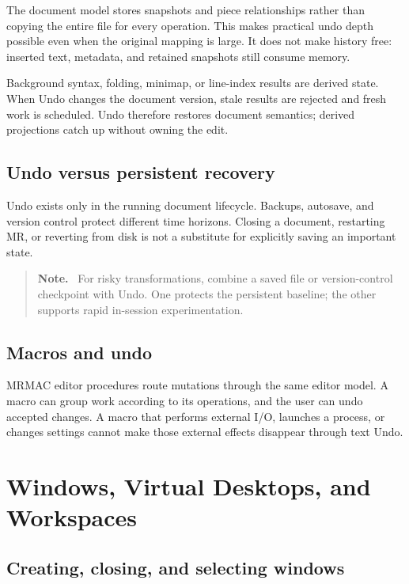 \documentclass[a4paper,10pt,twoside,openany]{book}
\newcommand{\mr}{\textsc{MR}}
\newenvironment{usernote}{\begin{quote}\small\textbf{Note.}\ }{\end{quote}}
\begin{document}
The document model stores snapshots and piece relationships rather than
copying the entire file for every operation. This makes practical undo depth
possible even when the original mapping is large. It does not make history
free: inserted text, metadata, and retained snapshots still consume memory.

Background syntax, folding, minimap, or line-index results are derived state.
When Undo changes the document version, stale results are rejected and fresh
work is scheduled. Undo therefore restores document semantics; derived
projections catch up without owning the edit.

\section{Undo versus persistent recovery}

Undo exists only in the running document lifecycle. Backups, autosave, and
version control protect different time horizons. Closing a document,
restarting \mr{}, or reverting from disk is not a substitute for explicitly
saving an important state.

\begin{usernote}
For risky transformations, combine a saved file or version-control checkpoint
with Undo. One protects the persistent baseline; the other supports rapid
in-session experimentation.
\end{usernote}

\section{Macros and undo}

MRMAC editor procedures route mutations through the same editor model.
A macro can group work according to its operations, and the user can undo
accepted changes. A macro that performs external I/O, launches a process, or
changes settings cannot make those external effects disappear through text
Undo.

\chapter{Windows, Virtual Desktops, and Workspaces}
\label{ch:windows-workspaces}

\section{Creating, closing, and selecting windows}
\end{document}
